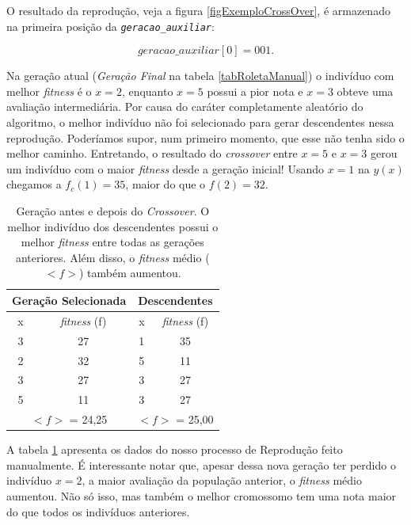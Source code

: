 	O resultado da reprodução, veja a figura \ref{figExemploCrossOver}, é armazenado na primeira posição da \textit{\texttt{geracao\_auxiliar}}:
	
	$$
		geracao\_auxiliar[0] = 001.
	$$
	
	Na geração atual (\textit{Geração Final} na tabela \ref{tabRoletaManual}) o indivíduo com melhor \textit{fitness} é o $x = 2$, enquanto $x = 5$ possui a pior nota e $x = 3$ obteve uma avaliação intermediária. Por causa do caráter completamente aleatório do algoritmo, o melhor indivíduo não foi selecionado para gerar descendentes nessa reprodução. Poderíamos supor, num primeiro momento, que esse não tenha sido o melhor caminho. Entretando, o resultado do \textit{crossover} entre $x = 5$ e $x = 3$ gerou um indivíduo com o maior \textit{fitness} desde a geração inicial! Usando $x = 1$ na $y(x)$ chegamos a $f_c(1) = 35$, maior do que o $f(2) = 32$.
	
\begin{table}[htp]
	\caption{\label{tabCrossoverManual}Geração antes e depois do \textit{Crossover}. O melhor indivíduo dos descendentes possui o melhor \textit{fitness} entre todas as gerações anteriores. Além disso, o \textit{fitness} médio ($<f>$) também aumentou.}
	\begin{center}
		\begin{tabular}{c|c|c|c}
			\hline
			\multicolumn{2}{c|}{\textbf{Geração Selecionada}} &  \multicolumn{2}{c}{\textbf{Descendentes}}  \\
			\hline
			x 					& \textit{fitness} (f)	& x						& \textit{fitness} (f)	\\
			\hline
			3 					& 27										& 1						&	35 \\
			2 					& 32 										& 5						&	11 \\
			3 					& 27										& 3						&	27 \\	
			5 					& 11										& 3						&	27\\
			\hline
			\multicolumn{2}{c|}{$<f>$ = 24,25} & \multicolumn{2}{c}{$<f>$ = 25,00}  \\
			\hline
		\end{tabular}
	\end{center}
\end{table}
	
	A tabela \ref{tabCrossoverManual} apresenta os dados do nosso processo de Reprodução feito manualmente. É interessante notar que, apesar dessa nova geração ter perdido o indivíduo $x = 2$, a maior avaliação da população anterior, o \textit{fitness} médio aumentou. Não só isso, mas também o melhor cromossomo tem uma nota maior do que todos os indivíduos anteriores. 
	
